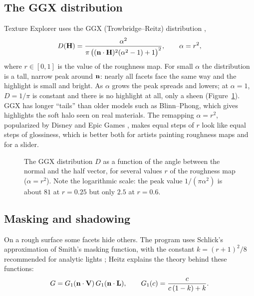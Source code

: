 \subsection{The GGX distribution}
Texture Explorer uses the GGX (Trowbridge--Reitz) distribution \cite{walter2007},
\[
  D(\mathbf{H}) = \frac{\alpha^2}{\pi\,\bigl((\mathbf{n}\cdot\mathbf{H})^2(\alpha^2-1)+1\bigr)^2},
  \qquad \alpha = r^2,
\]
where $r\in[0,1]$ is the value of the roughness map. For small $\alpha$ the distribution is a
tall, narrow peak around $\mathbf{n}$: nearly all facets face the same way and the highlight is
small and bright. As $\alpha$ grows the peak spreads and lowers; at $\alpha=1$, $D=1/\pi$ is
constant and there is no highlight at all, only a sheen (Figure~\ref{fig:ggx}). GGX has longer
``tails'' than older models such as Blinn--Phong, which gives highlights the soft halo seen on
real materials. The remapping $\alpha=r^2$, popularized by Disney and Epic Games
\cite{karis2013}, makes equal steps of $r$ look like equal steps of glossiness, which is better
both for artists painting roughness maps and for a slider.

\begin{figure}[ht]
\centering
{}
\caption{The GGX distribution $D$ as a function of the angle between the normal and the half
vector, for several values $r$ of the roughness map ($\alpha=r^2$). Note the logarithmic
scale: the peak value $1/(\pi\alpha^2)$ is about $81$ at $r=0.25$ but only $2.5$ at $r=0.6$.}
\label{fig:ggx}
\end{figure}

\subsection{Masking and shadowing}
On a rough surface some facets hide others. The program uses Schlick's approximation of Smith's
masking function, with the constant $k=(r+1)^2/8$ recommended for analytic lights
\cite{karis2013}; Heitz \cite{heitz2014} explains the theory behind these functions:
\[
  G = G_1(\mathbf{n}\cdot\mathbf{V})\,G_1(\mathbf{n}\cdot\mathbf{L}),\qquad
  G_1(c) = \frac{c}{c\,(1-k)+k}.
\]

